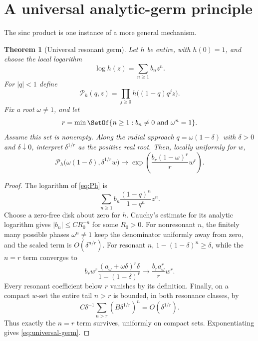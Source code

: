 \documentclass[11pt]{article}
\newtheorem{theorem}{Theorem}[section]
\theoremstyle{definition}
\begin{document}
\section{A universal analytic-germ principle}

The sinc product is one instance of a more general mechanism.

\begin{theorem}[Universal resonant germ]
Let $h$ be entire, with $h(0)=1$, and choose the local logarithm
\begin{equation}
 \log h(z)=\sum_{n\ge1}b_nz^n.
 \label{eq:germ-log}
\end{equation}
For $|q|<1$ define
\begin{equation}
 \mathcal P_h(q,z)=\prod_{j\ge0}h\bigl((1-q)q^jz\bigr).
 \label{eq:Ph}
\end{equation}
Fix a root $\omega\ne1$, and let
\begin{equation}
 r=\min\SetOf{n\ge1:b_n\ne0\ \text{and}\ \omega^n=1}.
 \label{eq:r-germ}
\end{equation}
Assume this set is nonempty.  Along the radial approach
$q=\omega(1-\delta)$ with $\delta>0$ and $\delta\downarrow0$, interpret
$\delta^{1/r}$ as the positive real root.  Then, locally uniformly for $w$,
\begin{equation}
 \boxed{
 \mathcal P_h\bigl(\omega(1-\delta),\delta^{1/r}w\bigr)
 \longrightarrow
 \exp\left(\frac{b_r(1-\omega)^r}{r}w^r\right).}
 \label{eq:universal-germ}
\end{equation}
\end{theorem}

\begin{proof}
The logarithm of \cref{eq:Ph} is
\[
 \sum_{n\ge1}b_n\frac{(1-q)^n}{1-q^n}z^n.
\]
Choose a zero-free disk about zero for $h$.  Cauchy's estimate for its analytic
logarithm gives $|b_n|\le CR_0^{-n}$ for some $R_0>0$.  For nonresonant $n$,
the finitely many possible phases $\omega^n\ne1$ keep the denominator uniformly
away from zero, and the scaled term is $O(\delta^{n/r})$.  For resonant $n$,
\(
 1-(1-\delta)^n\ge\delta
\), while the $n=r$ term converges to
\[
 b_r w^r\frac{(a_\omega+\omega\delta)^r\delta}
 {1-(1-\delta)^r}
 \longrightarrow \frac{b_ra_\omega^r}{r}w^r.
\]
Every resonant coefficient below $r$ vanishes by its definition.  Finally, on
a compact $w$-set the entire tail $n>r$ is bounded, in both resonance classes,
by
\[
 C\delta^{-1}\sum_{n>r}(B\delta^{1/r})^n
 =O(\delta^{1/r}).
\]
Thus exactly the $n=r$ term survives, uniformly on compact sets.  Exponentiating
gives \cref{eq:universal-germ}.
\end{proof}
\end{document}
